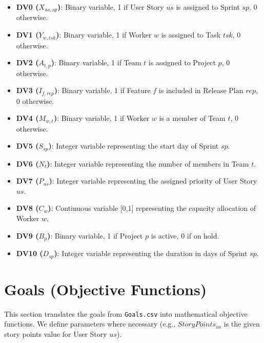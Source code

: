 \documentclass[11pt, a4paper]{article}
\begin{document}
\begin{itemize}
    \item \textbf{DV0 ($X_{us,sp}$)}: Binary variable, 1 if User Story $us$ is assigned to Sprint $sp$, 0 otherwise.
    \item \textbf{DV1 ($Y_{w,tsk}$)}: Binary variable, 1 if Worker $w$ is assigned to Task $tsk$, 0 otherwise.
    \item \textbf{DV2 ($A_{t,p}$)}: Binary variable, 1 if Team $t$ is assigned to Project $p$, 0 otherwise.
    \item \textbf{DV3 ($I_{f,rep}$)}: Binary variable, 1 if Feature $f$ is included in Release Plan $rep$, 0 otherwise.
    \item \textbf{DV4 ($M_{w,t}$)}: Binary variable, 1 if Worker $w$ is a member of Team $t$, 0 otherwise.
    \item \textbf{DV5 ($S_{sp}$)}: Integer variable representing the start day of Sprint $sp$.
    \item \textbf{DV6 ($N_{t}$)}: Integer variable representing the number of members in Team $t$.
    \item \textbf{DV7 ($P_{us}$)}: Integer variable representing the assigned priority of User Story $us$.
    \item \textbf{DV8 ($C_{w}$)}: Continuous variable [0,1] representing the capacity allocation of Worker $w$.
    \item \textbf{DV9 ($B_{p}$)}: Binary variable, 1 if Project $p$ is active, 0 if on hold.
    \item \textbf{DV10 ($D_{sp}$)}: Integer variable representing the duration in days of Sprint $sp$.
\end{itemize}

\section{Goals (Objective Functions)}
This section translates the goals from \texttt{Goals.csv} into mathematical objective functions. We define parameters where necessary (e.g., $StoryPoints_{us}$ is the given story points value for User Story $us$).
\end{document}
